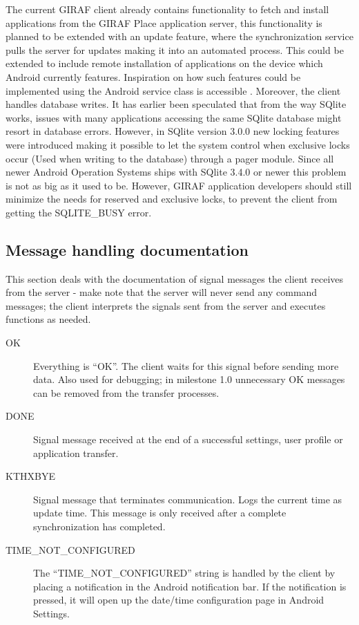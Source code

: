 The current GIRAF client already contains functionality to fetch and install applications from the GIRAF Place application server, this functionality is planned to be extended with an update feature, where the synchronization service pulls the server for updates making it into an automated process. This could be extended to include remote installation of applications on the device which Android currently features. Inspiration on how such features could be implemented using the Android service class is accessible \cite{DevRemote}. Moreover, the client handles database writes. It has earlier been speculated that from the way SQlite works, issues with many applications accessing the same SQlite database might resort in database errors. However, in SQlite version 3.0.0 new locking features were introduced making it possible to let the system control when exclusive locks occur (Used when writing to the database) through a pager module\cite{SQlite}. Since all newer Android Operation Systems ships with SQlite 3.4.0 or newer\cite{AndDevel} this problem is not as big as it used to be. However, GIRAF application developers should still minimize the needs for reserved and exclusive locks, to prevent the client from getting the SQLITE\_BUSY error.   

\subsection{Message handling documentation}
This section deals with the documentation of signal messages the client receives from the server - make note that the server will never send any command messages; the client interprets the signals sent from the server and executes functions as needed.   

\begin{description}
	\item[OK] Everything is ``OK''. The client waits for this signal before sending more data. Also used for debugging; in milestone 1.0 unnecessary OK messages can be removed from the transfer processes. 
	\item[DONE] Signal message received at the end of a successful settings, user profile or application transfer.
	\item[KTHXBYE] Signal message that terminates communication. Logs the current time as update time. This message is only received after a complete synchronization has completed.
	\item[TIME\_NOT\_CONFIGURED] The ``TIME\_NOT\_CONFIGURED'' string is handled by the client by placing a notification in the Android notification bar. If the notification is pressed, it will open up the date/time configuration page in Android Settings.
\end{description}

